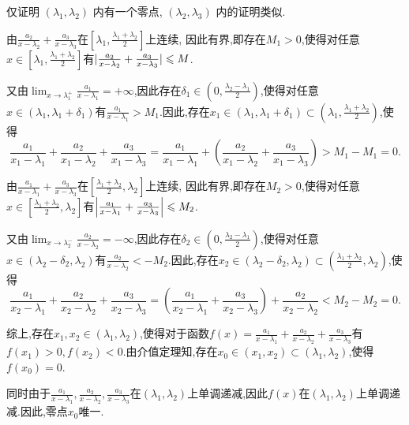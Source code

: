 \begin{solution}
    [解]
    仅证明 $(\lambda_1, \lambda_2)$ 内有一个零点, $(\lambda_2, \lambda_3)$ 内的证明类似.

    由$\frac{a_2}{x-\lambda_2} + \frac{a_3}{x-\lambda_3}$在$\left[\lambda_1, \frac{\lambda_1+\lambda_2}{2}\right]$上连续,
    因此有界,即存在$M_1 > 0$,使得对任意$x \in \left[\lambda_1, \frac{\lambda_1+\lambda_2}{2}\right]$有$|\frac{a_2}{x-\lambda_2} + \frac{a_3}{x-\lambda_3}| \leqslant M$.

    又由$\lim_{x \to \lambda_1^+} \frac{a_1}{x-\lambda_1} = +\infty$,因此存在$\delta_1 \in \left( 0, \frac{\lambda_2 - \lambda_1}{2} \right)$,使得对任意$x \in (\lambda_1, \lambda_1 + \delta_1)$有$\frac{a_1}{x-\lambda_1} > M_1$.因此,存在$x_1 \in (\lambda_1, \lambda_1 + \delta_1) \subset \left(\lambda_1, \frac{\lambda_1+\lambda_2}{2}\right)$,使得
    $$ \frac{a_1}{x_1-\lambda_1} + \frac{a_2}{x_1-\lambda_2} + \frac{a_3}{x_1-\lambda_3} = \frac{a_1}{x_1-\lambda_1} + \left( \frac{a_2}{x_1-\lambda_2} + \frac{a_3}{x_1-\lambda_3} \right) > M_1 - M_1 = 0. $$

    由$\frac{a_1}{x-\lambda_1} + \frac{a_3}{x-\lambda_3}$在$\left[\frac{\lambda_1+\lambda_2}{2}, \lambda_2\right]$上连续,
    因此有界,即存在$M_2 > 0$,使得对任意$x \in \left[\frac{\lambda_1+\lambda_2}{2}, \lambda_2\right]$有$\left|\frac{a_1}{x-\lambda_1} + \frac{a_3}{x-\lambda_3}\right| \leqslant M_2$.

    又由$\lim_{x \to \lambda_2^-} \frac{a_2}{x-\lambda_2} = -\infty$,因此存在$\delta_2 \in \left( 0, \frac{\lambda_2 - \lambda_1}{2} \right)$,使得对任意$x \in (\lambda_2 - \delta_2, \lambda_2)$有$\frac{a_2}{x-\lambda_2} < -M_2$.因此,存在$x_2 \in (\lambda_2 - \delta_2, \lambda_2) \subset \left(\frac{\lambda_1+\lambda_2}{2}, \lambda_2\right)$,使得
    $$ \frac{a_1}{x_2-\lambda_1} + \frac{a_2}{x_2-\lambda_2} + \frac{a_3}{x_2-\lambda_3} = \left( \frac{a_1}{x_2-\lambda_1} + \frac{a_3}{x_2-\lambda_3} \right) + \frac{a_2}{x_2-\lambda_2} < M_2 - M_2 = 0. $$

    综上,存在$x_1, x_2 \in (\lambda_1, \lambda_2)$,使得对于函数$f(x) = \frac{a_1}{x-\lambda_1} + \frac{a_2}{x-\lambda_2} + \frac{a_3}{x-\lambda_3}$有$f(x_1) > 0, f(x_2) < 0$.由介值定理知,存在$x_0 \in (x_1, x_2) \subset (\lambda_1, \lambda_2)$,使得$f(x_0) = 0$.

    同时由于$\frac{a_1}{x-\lambda_1}, \frac{a_2}{x-\lambda_2}, \frac{a_3}{x-\lambda_3}$在$(\lambda_1, \lambda_2)$上单调递减,因此$f(x)$在$(\lambda_1, \lambda_2)$上单调递减.因此,零点$x_0$唯一.
\end{solution}

